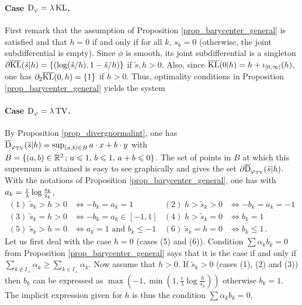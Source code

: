 \paragraph{Case $\operatorname{D}_\varphi = \lambda \operatorname{KL}$.}
First remark that the assumption of Proposition \ref{prop_barycenter_general} is satisfied and that $h=0$ if and only if for all $k$, $s_k=0$ (otherwise, the joint subdifferential is empty). 
Since $\phi$ is smooth, its joint subdifferential is a singleton $\partial \overline{\operatorname{KL}}(\tilde{s}|h) = \{(\log(\tilde{s}/h), 1-\tilde{s}/h) \}$ if $\tilde{s},h>0$. Also, since $\overline{\operatorname{KL}}(0|h)=h+ \iota_{[0,\infty[}(h)$, one has $\partial_2 \overline{\operatorname{KL}}(0,h) = \{1\}$ if $h>0$. Thus, optimality conditions in Proposition \ref{prop_barycenter_general} yields the system

\paragraph{Case $\operatorname{D}_\varphi = \lambda \operatorname{TV}$.}
By Proposition \ref{prop_divergnormalint}, one has $\overline{\operatorname{D}}_{\varphi_{\operatorname{TV}}}(\tilde{s}|h) = \sup_{(a,b)\in B} a\cdot x + b\cdot y $ with $B = \{ (a,b)\in \mathbb{R}^2\, ; \, a\leqslant1, \, b\leqslant 1, \, a+b\leqslant 0 \}$. The set of points in $B$ at which this supremum is attained is easy to see graphically and gives the set $\partial \overline{\operatorname{D}}_{\varphi_{\operatorname{TV}}}(\tilde{s}|h)$. With the notations of Proposition \ref{prop_barycenter_general}, one has with $a_k=\frac{\varepsilon}{\lambda} \log \frac{s_k}{\tilde{s}_k}$,
\begin{align*}
(1)\; \tilde{s}_k > h > 0 &\Leftrightarrow -b_k=a_k=1 &
(2)\;  h > \tilde{s}_k > 0 &\Leftrightarrow -b_k=a_k=-1 \\
(3)\; \tilde{s}_k = h > 0 &\Leftrightarrow -b_k=a_k\in [-1,1] &
(4)\; h > \tilde{s}_k = 0&\Leftrightarrow  b_k = 1 \\
(5)\; \tilde{s}_k > h = 0 &\Leftrightarrow a_k = 1 \text{ and } b_k\leq-1 &
(6)\; \tilde{s}_k = h = 0 &\Leftrightarrow b_k \leq 1 \, .
\end{align*}
Let us first deal with the case $h=0$ (cases (5) and (6)). Condition $\sum \alpha_k b_k=0$ from Proposition \ref{prop_barycenter_general} says that it is the case if and only if $\sum_{k\notin I_+} \alpha_k \geq \sum_{k \in I_+} \alpha_k$. 
%
Now assume that $h>0$. If $\tilde{s}_k>0$ (cases (1), (2) and (3)) then $b_k$ can be expressed as $\max ( -1 , \min ( 1 , \frac{\epsilon}{\lambda } \log \frac{h}{s_k}))$ otherwise $b_k=1$. The implicit expression given for $h$ is thus the condition $\sum \alpha_k b_k =0$.

